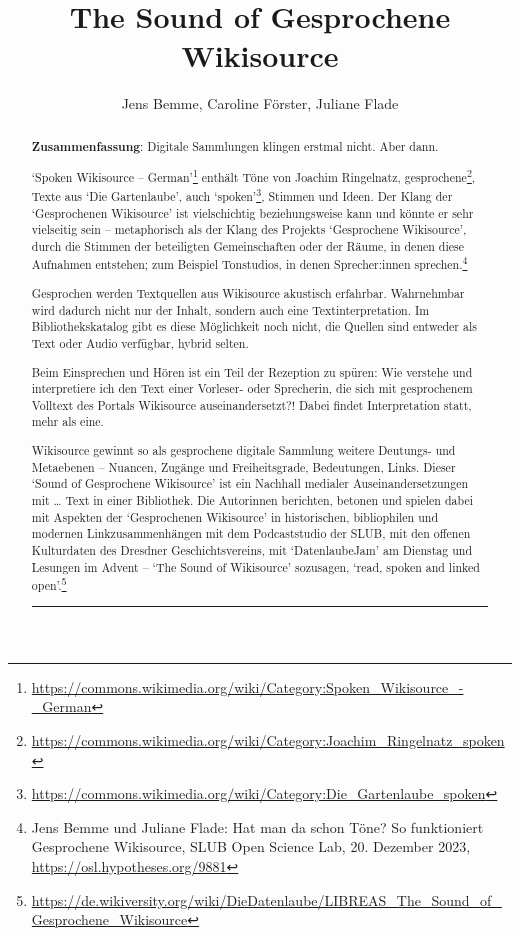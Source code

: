 \documentclass[a4paper,
fontsize=11pt,
oneside,
numbers=noperiodatend,
parskip=half-,
bibliography=totoc,
final
]{scrartcl}
\title{\LARGE{The Sound of Gesprochene Wikisource}}%
\author{Jens Bemme, Caroline Förster, Juliane Flade} %
\date{}
\begin{document}
\maketitle
\thispagestyle{fancyplain} 

\begin{abstract}
\noindent
\textbf{Zusammenfassung}: Digitale Sammlungen klingen erstmal nicht. Aber dann.

\enquote*{Spoken Wikisource -- German}\footnote{\url{https://commons.wikimedia.org/wiki/Category:Spoken_Wikisource_-_German}} enthält Töne von Joachim Ringelnatz,
gesprochene\footnote{\url{https://commons.wikimedia.org/wiki/Category:Joachim_Ringelnatz_spoken}}, Texte aus \enquote*{Die Gartenlaube}, auch \enquote*{spoken}\footnote{\url{https://commons.wikimedia.org/wiki/Category:Die_Gartenlaube_spoken}}, Stimmen und
Ideen. Der Klang der \enquote*{Gesprochenen Wikisource} ist vielschichtig
beziehungsweise kann und könnte er sehr vielseitig sein -- metaphorisch
als der Klang des Projekts \enquote*{Gesprochene Wikisource}, durch die Stimmen
der beteiligten Gemeinschaften oder der Räume, in denen diese Aufnahmen
entstehen; zum Beispiel Tonstudios, in denen Sprecher:innen sprechen.\footnote{Jens Bemme und Juliane Flade: Hat man da schon Töne? So funktioniert Gesprochene Wikisource, SLUB Open Science Lab, 20. Dezember 2023, \url{https://osl.hypotheses.org/9881}}

Gesprochen werden Textquellen aus Wikisource akustisch erfahrbar.
Wahrnehmbar wird dadurch nicht nur der Inhalt, sondern auch eine
Textinterpretation. Im Bibliothekskatalog gibt es diese Möglichkeit noch
nicht, die Quellen sind entweder als Text oder Audio verfügbar, hybrid
selten.

Beim Einsprechen und Hören ist ein Teil der Rezeption zu spüren:
Wie verstehe und interpretiere ich den Text einer Vorleser- oder
Sprecherin, die sich mit gesprochenem Volltext des Portals Wikisource
auseinandersetzt?! Dabei findet Interpretation statt, mehr als eine.

Wikisource gewinnt so als gesprochene digitale Sammlung weitere
Deutungs- und Metaebenen -- Nuancen, Zugänge und Freiheitsgrade,
Bedeutungen, Links. Dieser \enquote*{Sound of Gesprochene Wikisource} ist ein
Nachhall medialer Auseinandersetzungen mit \ldots{} Text in einer
Bibliothek. Die Autorinnen berichten, betonen und spielen dabei mit
Aspekten der \enquote*{Gesprochenen Wikisource} in historischen, bibliophilen und
modernen Linkzusammenhängen mit dem Podcaststudio der SLUB, mit den
offenen Kulturdaten des Dresdner Geschichtsvereins, mit \enquote*{DatenlaubeJam}
am Dienstag und Lesungen im Advent -- \enquote*{The Sound of Wikisource}
sozusagen, \enquote*{read, spoken and linked open}.\footnote{\url{https://de.wikiversity.org/wiki/DieDatenlaube/LIBREAS_The_Sound_of_Gesprochene_Wikisource}}

\begin{center}\rule{0.5\linewidth}{0.5pt}\end{center}
\end{abstract}
\end{document}
